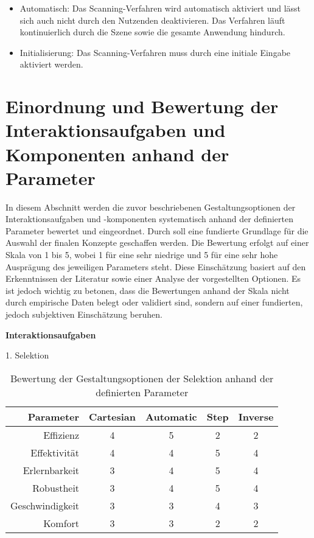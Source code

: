 \begin{itemize}
    \item Automatisch: Das Scanning-Verfahren wird automatisch aktiviert und lässt sich auch nicht durch den Nutzenden deaktivieren. Das Verfahren läuft kontinuierlich durch die Szene sowie die gesamte Anwendung hindurch.
    \item Initialisierung: Das Scanning-Verfahren muss durch eine initiale Eingabe aktiviert werden. 
\end{itemize}

\section{Einordnung und Bewertung der Interaktionsaufgaben und Komponenten anhand der Parameter}

In diesem Abschnitt werden die zuvor beschriebenen Gestaltungsoptionen der Interaktionsaufgaben und -komponenten systematisch anhand der definierten Parameter bewertet und eingeordnet. Durch soll eine fundierte Grundlage für die Auswahl der finalen Konzepte geschaffen werden.
Die Bewertung erfolgt auf einer Skala von 1 bis 5, wobei 1 für eine sehr niedrige und 5 für eine sehr hohe Ausprägung des jeweiligen Parameters steht. Diese Einschätzung basiert auf den Erkenntnissen der Literatur sowie einer Analyse der vorgestellten Optionen. Es ist jedoch wichtig zu betonen, dass die Bewertungen anhand der Skala nicht durch empirische Daten belegt oder validiert sind, sondern auf einer fundierten, jedoch subjektiven Einschätzung beruhen. 

{\normalfont \bfseries Interaktionsaufgaben}  

1. Selektion

\begin{table}[ht]
 \centering
 \begin{tabular}{r|c|c|c|c}
 Parameter & Cartesian & Automatic & Step & Inverse\\
 \hline
 Effizienz & 4 & 5 & 2 & 2\\
 Effektivität & 4 & 4 & 5 & 4\\
 Erlernbarkeit & 3 & 4 & 5 & 4\\
 Robustheit & 3 & 4 & 5 & 4\\
 Geschwindigkeit & 3 & 3 & 4 & 3\\
 Komfort & 3 & 3 & 2 & 2 \\
 \end{tabular}
 \caption{Bewertung der Gestaltungsoptionen der Selektion anhand der definierten Parameter}
 \label{tab:Selektion}
\end{table}

